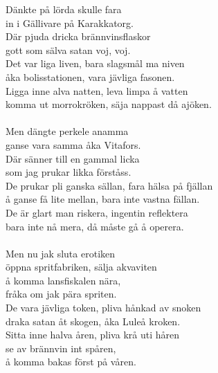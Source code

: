 \vspace{10pt}
Dänkte på lörda skulle fara\\
in i Gällivare på Karakkatorg.\\
Där pjuda dricka brännvinsflaskor\\
gott som sälva satan voj, voj.\\
Det var liga liven, bara slagsmål ma niven\\
åka bolisstationen, vara jävliga fasonen.\\
Ligga inne alva natten, leva limpa å vatten\\
komma ut morrokröken, säja nappast då ajöken.\\
\\
Men dängte perkele anamma\\
ganse vara samma åka Vitafors.\\
Där sänner till en gammal licka\\
som jag prukar likka förståss.\\
De prukar pli ganska sällan, fara hälsa på fjällan\\
å ganse få lite mellan, bara inte vastna fällan.\\
De är glart man riskera, ingentin reflektera\\
bara inte nå mera, då måste gå å operera.\\
\\
Men nu jak sluta erotiken\\
öppna spritfabriken, sälja akvaviten\\
å komma lansfiskalen nära,\\
fråka om jak pära spriten.\\
De vara jävliga token, pliva hånkad av snoken\\
draka satan åt skogen, åka Luleå kroken.\\
Sitta inne halva åren, pliva krå uti håren\\
se av brännvin int spåren,\\
å komma bakas först på våren.
